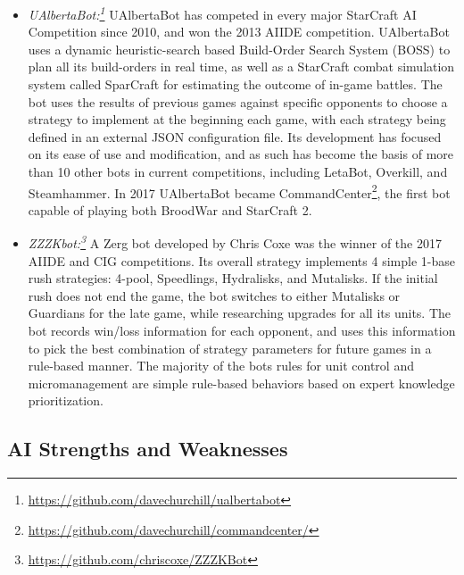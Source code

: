 \begin{itemize}
  \item {\em UAlbertaBot:\footnote{\url{https://github.com/davechurchill/ualbertabot}}} UAlbertaBot has competed in every major StarCraft AI Competition since 2010, and won the 2013 AIIDE competition. UAlbertaBot uses a dynamic heuristic-search based Build-Order Search System (BOSS) to plan all its build-orders in real time, as well as a StarCraft combat simulation system called SparCraft for estimating the outcome of in-game battles. The bot uses the results of previous games against specific opponents to choose a strategy to implement at the beginning each game, with each strategy being defined in an external JSON configuration file. Its development has focused on its ease of use and modification, and as such has become the basis of more than 10 other bots in current competitions, including LetaBot, Overkill, and Steamhammer. In 2017 UAlbertaBot became CommandCenter\footnote{\url{https://github.com/davechurchill/commandcenter/}}, the first bot capable of playing both BroodWar and StarCraft 2.
  
  
  \item {\em ZZZKbot:\footnote{\url{https://github.com/chriscoxe/ZZZKBot}}} A Zerg bot developed by Chris Coxe was the winner of the 2017 AIIDE and CIG competitions. Its overall strategy implements 4 simple 1-base rush strategies: 4-pool, Speedlings, Hydralisks, and Mutalisks. If the initial rush does not end the game, the bot switches to either Mutalisks or Guardians for the late game, while researching upgrades for all its units. The bot records win/loss information for each opponent, and uses this information to pick the best combination of strategy parameters for future games in a rule-based manner. The majority of the bots rules for unit control and micromanagement are simple rule-based behaviors based on expert knowledge prioritization.

\end{itemize}

\subsection{AI Strengths and Weaknesses}

